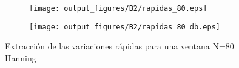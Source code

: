 \documentclass{article}
\begin{document}
        \clearpage
        \begin{figure}[h]
                \centering
                \begin{subfigure}
                    \centering          \texttt{[image: output\_figures/B2/rapidas\_80.eps]}
               \end{subfigure}
               \begin{subfigure}
                    \centering          \texttt{[image: output\_figures/B2/rapidas\_80\_db.eps]}
               \end{subfigure}    
               \caption{Extracción de las variaciones rápidas para una ventana N=80 Hanning}
                \label{fig:sup_rugosas}
        \end{figure}
            
        
    
\end{document}
